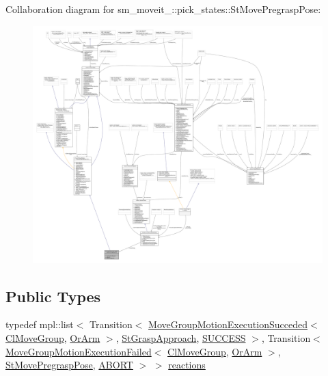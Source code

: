 Collaboration diagram for sm\+\_\+moveit\+\_\+:\+:pick\+\_\+states\+:\+:St\+Move\+Pregrasp\+Pose\+:
\nopagebreak
\begin{figure}[H]
\begin{center}
\leavevmode
\includegraphics[width=350pt]{structsm__moveit__4_1_1pick__states_1_1StMovePregraspPose__coll__graph}
\end{center}
\end{figure}
\subsection*{Public Types}
\begin{DoxyCompactItemize}
\item 
typedef mpl\+::list$<$ Transition$<$ \hyperlink{structmoveit__z__client_1_1MoveGroupMotionExecutionSucceded}{Move\+Group\+Motion\+Execution\+Succeded}$<$ \hyperlink{classmoveit__z__client_1_1ClMoveGroup}{Cl\+Move\+Group}, \hyperlink{classsm__moveit__4_1_1OrArm}{Or\+Arm} $>$, \hyperlink{structsm__moveit__4_1_1pick__states_1_1StGraspApproach}{St\+Grasp\+Approach}, \hyperlink{classSUCCESS}{S\+U\+C\+C\+E\+SS} $>$, Transition$<$ \hyperlink{structmoveit__z__client_1_1MoveGroupMotionExecutionFailed}{Move\+Group\+Motion\+Execution\+Failed}$<$ \hyperlink{classmoveit__z__client_1_1ClMoveGroup}{Cl\+Move\+Group}, \hyperlink{classsm__moveit__4_1_1OrArm}{Or\+Arm} $>$, \hyperlink{structsm__moveit__4_1_1pick__states_1_1StMovePregraspPose}{St\+Move\+Pregrasp\+Pose}, \hyperlink{classABORT}{A\+B\+O\+RT} $>$ $>$ \hyperlink{structsm__moveit__4_1_1pick__states_1_1StMovePregraspPose_a4329bf7123b5978a7418bda57b17541d}{reactions}
\end{DoxyCompactItemize}
